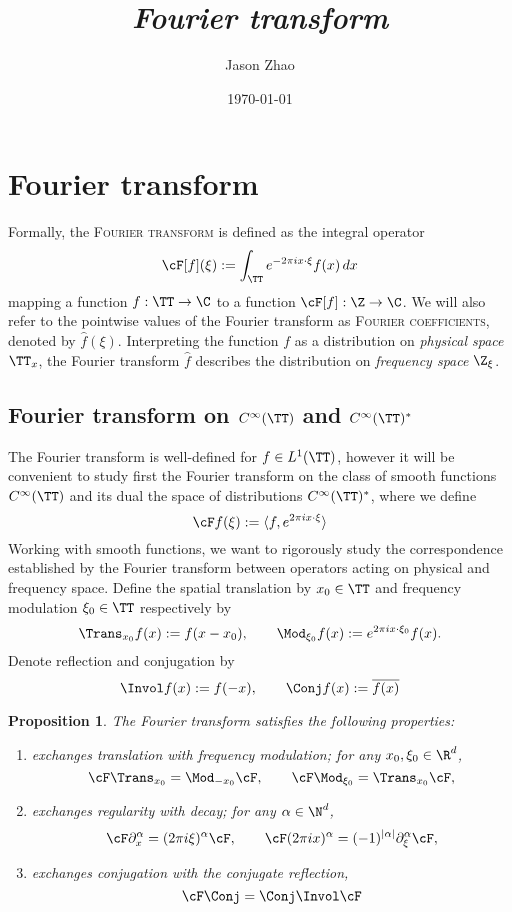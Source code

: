 \documentclass[reqno]{amsart}
\title
{
	\emph{Fourier transform}
}
\author{Jason Zhao}
\date{\today}
\newtheorem{proposition}[theorem]{Proposition}
\theoremstyle{definition}
\theoremstyle{remark}
\renewcommand{\emph}{\textsc}
\begin{document}
\maketitle

\tableofcontents

\section{Fourier transform}

Formally, the \emph{Fourier transform} is defined as the integral operator
	\[ \cF [f] (\xi) := \int_{\TT} e^{-2\pi i x \cdot \xi} f(x) \, dx \]
mapping a function $f : \TT \to \C$ to a function $\cF [f] : \Z \to \C$. We will also refer to the pointwise values of the Fourier transform as \emph{Fourier coefficients}, denoted by $\widehat f (\xi)$. Interpreting the function $f$ as a distribution on \textit{physical space} $\TT_x$, the Fourier transform $\widehat f$ describes the distribution on \textit{frequency space} $\Z_\xi$. 


\subsection{Fourier transform on $C^\infty (\TT)$ and $C^\infty (\TT)^*$}

The Fourier transform is well-defined for $f \in L^1 (\TT)$, however it will be convenient to study first the Fourier transform on the class of smooth functions $C^\infty (\TT)$ and its dual the space of distributions $C^\infty (\TT)^*$, where we define
	\[ \cF f (\xi) := \langle f, e^{2\pi i x \cdot \xi} \rangle \]
Working with smooth functions, we want to rigorously study the correspondence established by the Fourier transform between operators acting on physical and frequency space. Define the spatial translation by $x_0 \in \TT$ and frequency modulation $\xi_0 \in \TT$ respectively by
	\[ \Trans_{x_0} f(x) := f(x - x_0), \qquad \Mod_{\xi_0} f(x) := e^{2\pi i x \cdot \xi_0} f(x). \]
Denote reflection and conjugation by
	\[ \Invol f (x) := f(-x), \qquad \Conj f (x) := \overline{f(x)} \]
	

\begin{proposition}
	The Fourier transform satisfies the following properties:
	\begin{enumerate}
		\item exchanges translation with frequency modulation; for any $x_0, \xi_0 \in \R^d$, 
						\[ \cF \Trans_{x_0} = \Mod_{-x_0} \cF, \qquad \cF \Mod_{\xi_0} = \Trans_{x_0} \cF , \]
		\item exchanges regularity with decay; for any $\alpha \in \N^d$,
						\[ \cF \partial_x^\alpha  = (2\pi i  \xi)^\alpha \cF , \qquad \cF (2\pi ix)^\alpha = (-1)^{|\alpha|} \partial_\xi^\alpha \cF, \] 
		\item exchanges conjugation with the conjugate reflection,
			\[ \cF \Conj = \Conj \Invol \cF \]
	\end{enumerate}
	\label{prop:symmetry}
\end{proposition}
\end{document}
